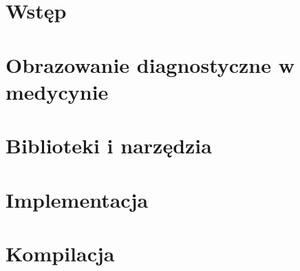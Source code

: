 \chapter{Wstęp}


\chapter{Obrazowanie diagnostyczne w medycynie}


\chapter{Biblioteki i narzędzia}


\chapter{Implementacja}


\chapter{Kompilacja}

